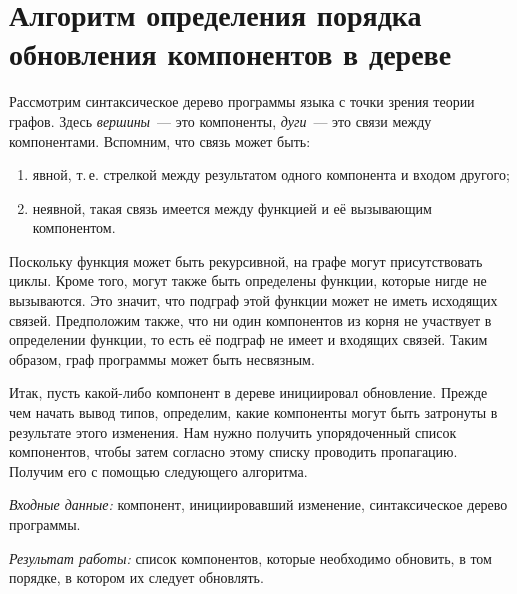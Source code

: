\section{Алгоритм определения порядка обновления компонентов в дереве}\label{alg_order}
Рассмотрим синтаксическое дерево программы языка с точки зрения теории графов. Здесь \textit{вершины}~--- это компоненты, \textit{дуги}~--- это связи между компонентами. Вспомним, что связь может быть:
	\begin{enumerate}[1)]
		\item явной, т.\,е. стрелкой между результатом одного компонента и входом другого;
		\item неявной, такая связь имеется между функцией и её вызывающим компонентом.
	\end{enumerate}
Поскольку функция может быть рекурсивной, на графе могут присутствовать циклы. Кроме того, могут также быть определены функции, которые нигде не вызываются. Это значит, что подграф этой функции может не иметь исходящих связей. Предположим также, что ни один компонентов из корня не участвует в определении функции, то есть её подграф не имеет и входящих связей. Таким образом, граф программы может быть несвязным.

Итак, пусть какой-либо компонент в дереве инициировал обновление. Прежде чем начать вывод типов, определим, какие компоненты могут быть затронуты в результате этого изменения. Нам нужно получить упорядоченный список компонентов, чтобы затем согласно этому списку проводить пропагацию. Получим его с помощью следующего алгоритма.

\textit{Входные данные:} компонент, инициировавший изменение, синтаксическое дерево программы.

\textit{Результат работы:} список компонентов, которые необходимо обновить, в том порядке, в котором их следует обновлять.

